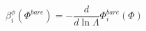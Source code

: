 \begin{equation}
\beta^\phi_i(\Phi^{bare})=-\frac{d}{d\ln\Lambda}\Phi^{bare}_i(\Phi)
\end{equation}

